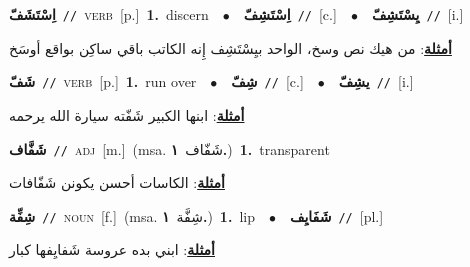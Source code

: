 \documentclass[10pt,a4paper,twoside]{article} %
\begin{document}
\begin{multicols}{2}
{\setlength\topsep{0pt}\textbf{\foreignlanguage{arabic}{اِسْتَشَفّ}}\ {\color{gray}\texttt{//}\color{black}}\ \textsc{verb}\ [p.]\ \textbf{1.}~discern\ \ $\bullet$\ \ \setlength\topsep{0pt}\textbf{\foreignlanguage{arabic}{اِسْتَشِفّ}}\ {\color{gray}\texttt{//}\color{black}}\ [c.]\ \ $\bullet$\ \ \setlength\topsep{0pt}\textbf{\foreignlanguage{arabic}{يِسْتَشِفّ}}\ {\color{gray}\texttt{//}\color{black}}\ [i.]\  \begin{flushright}\color{gray}\foreignlanguage{arabic}{\textbf{\underline{\foreignlanguage{arabic}{أمثلة}}}: من هيك نص وسخ، الواحد بيِسْتَشِف إِنه الكاتب باقي ساكِن بواقع أوسَخ}\end{flushright}\color{black}} \vspace{2mm}

{\setlength\topsep{0pt}\textbf{\foreignlanguage{arabic}{شَفّ}}\ {\color{gray}\texttt{//}\color{black}}\ \textsc{verb}\ [p.]\ \textbf{1.}~run over\ \ $\bullet$\ \ \setlength\topsep{0pt}\textbf{\foreignlanguage{arabic}{شِفّ}}\ {\color{gray}\texttt{//}\color{black}}\ [c.]\ \ $\bullet$\ \ \setlength\topsep{0pt}\textbf{\foreignlanguage{arabic}{يشِفّ}}\ {\color{gray}\texttt{//}\color{black}}\ [i.]\  \begin{flushright}\color{gray}\foreignlanguage{arabic}{\textbf{\underline{\foreignlanguage{arabic}{أمثلة}}}: ابنها الكبير شَفّته سيارة الله يرحمه}\end{flushright}\color{black}} \vspace{2mm}

{\setlength\topsep{0pt}\textbf{\foreignlanguage{arabic}{شَفَّاف}}\ {\color{gray}\texttt{//}\color{black}}\ \textsc{adj}\ [m.]\ \color{gray}(msa. \foreignlanguage{arabic}{شَفّاف}~\foreignlanguage{arabic}{\textbf{١.}})\color{black}\ \textbf{1.}~transparent\  \begin{flushright}\color{gray}\foreignlanguage{arabic}{\textbf{\underline{\foreignlanguage{arabic}{أمثلة}}}: الكاسات أحسن يكونن شَفّافات}\end{flushright}\color{black}} \vspace{2mm}

{\setlength\topsep{0pt}\textbf{\foreignlanguage{arabic}{شِفِّة}}\ {\color{gray}\texttt{//}\color{black}}\ \textsc{noun}\ [f.]\ \color{gray}(msa. \foreignlanguage{arabic}{شِفَّة}~\foreignlanguage{arabic}{\textbf{١.}})\color{black}\ \textbf{1.}~lip\ \ $\bullet$\ \ \setlength\topsep{0pt}\textbf{\foreignlanguage{arabic}{شَفَايِف}}\ {\color{gray}\texttt{//}\color{black}}\ [pl.]\  \begin{flushright}\color{gray}\foreignlanguage{arabic}{\textbf{\underline{\foreignlanguage{arabic}{أمثلة}}}: ابني بده عروسة شَفايِفها كبار}\end{flushright}\color{black}} \vspace{2mm}


\end{multicols}
\end{document}
